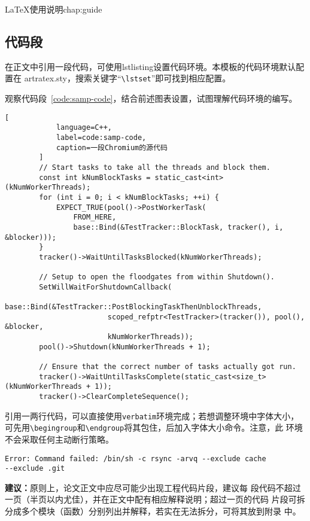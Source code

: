 \begin{cuzchapter}{\LaTeX{}使用说明}{chap:guide}
    \subsection{代码段}\label{sub:listings}

    在正文中引用一段代码，可使用lstlisting设置代码环境。本模板的代码环境默认配置在
    artratex.sty，搜索关键字“\verb|\lstset|”即可找到相应配置。

    观察代码段~\ref{code:samp-code}，结合前述图表设置，试图理解代码环境的编写。

    \begin{lstlisting}[
            language=C++,
            label=code:samp-code,
            caption=一段Chromium的源代码
        ]
        // Start tasks to take all the threads and block them.
        const int kNumBlockTasks = static_cast<int>(kNumWorkerThreads);
        for (int i = 0; i < kNumBlockTasks; ++i) {
            EXPECT_TRUE(pool()->PostWorkerTask(
                FROM_HERE,
                base::Bind(&TestTracker::BlockTask, tracker(), i, &blocker)));
        }
        tracker()->WaitUntilTasksBlocked(kNumWorkerThreads);

        // Setup to open the floodgates from within Shutdown().
        SetWillWaitForShutdownCallback(
            base::Bind(&TestTracker::PostBlockingTaskThenUnblockThreads,
                        scoped_refptr<TestTracker>(tracker()), pool(), &blocker,
                        kNumWorkerThreads));
        pool()->Shutdown(kNumWorkerThreads + 1);

        // Ensure that the correct number of tasks actually got run.
        tracker()->WaitUntilTasksComplete(static_cast<size_t>(kNumWorkerThreads + 1));
        tracker()->ClearCompleteSequence();
    \end{lstlisting}

    引用一两行代码，可以直接使用\texttt{verbatim}环境完成；若想调整环境中字体大小，
    可先用\verb|\begingroup|和\verb|\endgroup|将其包住，后加入字体大小命令。注意，此
    环境不会采取任何主动断行策略。

    \begingroup
    \small
    \begin{verbatim}
Error: Command failed: /bin/sh -c rsync -arvq --exclude cache
--exclude .git 
    \end{verbatim}
    \endgroup

    \begin{leftbar}
        \noindent\textbf{建议：}原则上，论文正文中应尽可能少出现工程代码片段，建议每
        段代码不超过一页（半页以内尤佳），并在正文中配有相应解释说明；超过一页的代码
        片段可拆分成多个模块（函数）分别列出并解释，若实在无法拆分，可将其放到附录
        中。
    \end{leftbar}


\end{cuzchapter}
